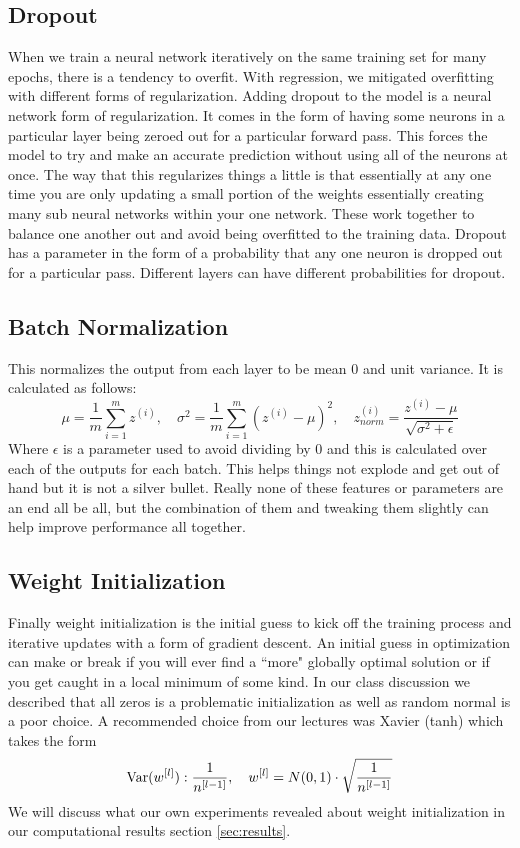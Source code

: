 \documentclass[10pt]{amsart}
\begin{document}
\subsection{Dropout}
When we train a neural network iteratively on the same training set for many epochs, there is a tendency to overfit.
With regression, we mitigated overfitting with different forms of regularization.
Adding dropout to the model is a neural network form of regularization.
It comes in the form of having some neurons in a particular layer being zeroed out for a particular forward pass.
This forces the model to try and make an accurate prediction without using all of the neurons at once.
The way that this regularizes things a little is that essentially at any one time you are only updating a small portion of the weights essentially creating many sub neural networks within your one network.
These work together to balance one another out and avoid being overfitted to the training data.
Dropout has a parameter in the form of a probability that any one neuron is dropped out for a particular pass.
Different layers can have different probabilities for dropout.

\subsection{Batch Normalization}
This normalizes the output from each layer to be mean 0 and unit variance.
It is calculated as follows:
\begin{equation}
\mu = \frac 1 m \sum_{i = 1}^m z^{(i)}, \quad
\sigma^2 = \frac 1 m \sum_{i = 1}^m \left( z^{(i)} - \mu \right)^2, \quad
z_{norm}^{(i)} = \frac {z^{(i)} - \mu}{\sqrt{\sigma^2 + \epsilon}}
\label{eq:bn}
\end{equation}
Where $\epsilon$ is a parameter used to avoid dividing by 0 and this is calculated over each of the outputs for each batch.
This helps things not explode and get out of hand but it is not a silver bullet.
Really none of these features or parameters are an end all be all, but the combination of them and tweaking them slightly can help improve performance all together.

\subsection{Weight Initialization}
Finally weight initialization is the initial guess to kick off the training process and iterative updates with a form of gradient descent.
An initial guess in optimization can make or break if you will ever find a ``more" globally optimal solution or if you get caught in a local minimum of some kind.
In our class discussion we described that all zeros is a problematic initialization as well as random normal is a poor choice.
A recommended choice from our lectures was Xavier (tanh) which takes the form
\begin{equation}
{\rm Var} ( w^{[l]}): \frac 1 {n^{[l - 1]}}, \quad 
w^{[l]} = N(0, 1) \cdot \sqrt{ \frac 1 {n^{[l - 1]}} }
\label{eq:weight_init}
\end{equation}
We will discuss what our own experiments revealed about weight initialization in our computational results section \ref{sec:results}.
\end{document}
